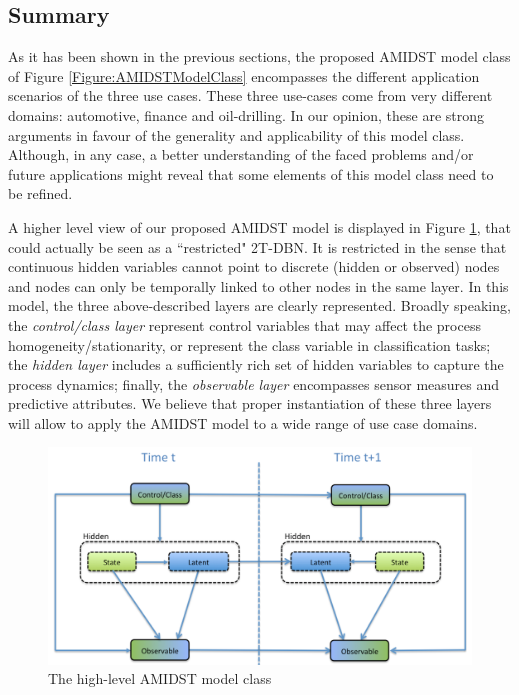 \subsection{Summary}\label{summaryAMIDSTModels}

As it has been shown in the previous sections, the proposed AMIDST model class of Figure \ref{Figure:AMIDSTModelClass} encompasses the different application scenarios of the three use cases. These three use-cases come from very different domains: automotive, finance and oil-drilling. In our opinion, these are strong arguments in favour of the generality and applicability of this model class. Although, in any case, a better understanding of the faced problems and/or future applications might reveal that some elements of this model class need to be refined.  

A higher level view of our proposed AMIDST model is displayed in Figure \ref{Figure:AMIDSTModelClassHighLevel}, that could actually be seen as a ``restricted" 2T-DBN. It is restricted in the sense that continuous hidden variables cannot point to discrete (hidden or observed) nodes and nodes can only be temporally linked to other nodes in the same layer. In this model, the three above-described layers are clearly represented. Broadly speaking, the \textit{control/class layer} represent control variables that may affect the process homogeneity/stationarity, or represent the class variable in classification tasks; the \textit{hidden layer} includes a sufficiently rich set of hidden variables to capture the process dynamics; finally, the \textit{observable layer} encompasses sensor measures and predictive attributes. We believe that proper instantiation of these three layers will allow to apply the AMIDST model to a wide range of use case domains.


\begin{figure}[ht!]
\begin{center}
\includegraphics[scale=0.4]{./figures/AMIDSTModelClassGeneral}
\caption{\label{Figure:AMIDSTModelClassHighLevel} The high-level AMIDST model class}
\end{center}
\end{figure}


